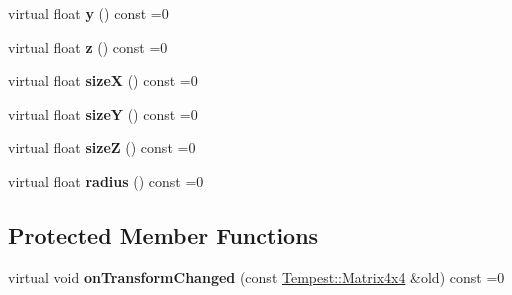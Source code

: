 \begin{DoxyCompactItemize}
\item 
\hypertarget{class_tempest_1_1_abstract_scene_object_a875dae888de29b0aa9387dd1e8b684eb}{virtual float {\bfseries y} () const =0}\label{class_tempest_1_1_abstract_scene_object_a875dae888de29b0aa9387dd1e8b684eb}

\item 
\hypertarget{class_tempest_1_1_abstract_scene_object_a0c9048cdd609083f54ad8b7f03b90021}{virtual float {\bfseries z} () const =0}\label{class_tempest_1_1_abstract_scene_object_a0c9048cdd609083f54ad8b7f03b90021}

\item 
\hypertarget{class_tempest_1_1_abstract_scene_object_af73349b4acb4c9fad3abe3e337402343}{virtual float {\bfseries size\+X} () const =0}\label{class_tempest_1_1_abstract_scene_object_af73349b4acb4c9fad3abe3e337402343}

\item 
\hypertarget{class_tempest_1_1_abstract_scene_object_af0c7c366e0d160159e0ffc7ca165c70f}{virtual float {\bfseries size\+Y} () const =0}\label{class_tempest_1_1_abstract_scene_object_af0c7c366e0d160159e0ffc7ca165c70f}

\item 
\hypertarget{class_tempest_1_1_abstract_scene_object_add83241e8f4cc9a51c2e9f0ebb3ac4cd}{virtual float {\bfseries size\+Z} () const =0}\label{class_tempest_1_1_abstract_scene_object_add83241e8f4cc9a51c2e9f0ebb3ac4cd}

\item 
\hypertarget{class_tempest_1_1_abstract_scene_object_a2fb08be9fae7ef8c5d422b9c47650a16}{virtual float {\bfseries radius} () const =0}\label{class_tempest_1_1_abstract_scene_object_a2fb08be9fae7ef8c5d422b9c47650a16}

\end{DoxyCompactItemize}
\subsection*{Protected Member Functions}
\begin{DoxyCompactItemize}
\item 
\hypertarget{class_tempest_1_1_abstract_scene_object_adeafe373523ba8a6d2f490977e808b50}{virtual void {\bfseries on\+Transform\+Changed} (const \hyperlink{class_tempest_1_1_matrix4x4}{Tempest\+::\+Matrix4x4} \&old) const =0}\label{class_tempest_1_1_abstract_scene_object_adeafe373523ba8a6d2f490977e808b50}

\end{DoxyCompactItemize}
